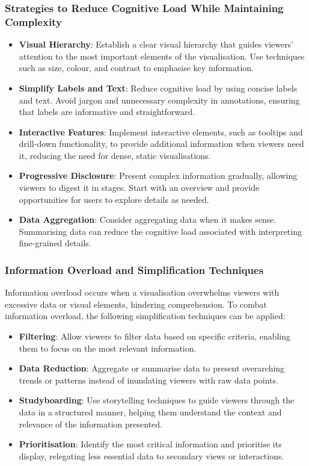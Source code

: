\documentclass{article}\usepackage[]{graphicx}\usepackage[]{xcolor}
\begin{document}
\subsubsection{Strategies to Reduce Cognitive Load While Maintaining Complexity}
\begin{itemize}
    \item \textbf{Visual Hierarchy}: Establish a clear visual hierarchy that guides viewers' attention to the most important elements of the visualisation. Use techniques such as size, colour, and contrast to emphasise key information.
    \item \textbf{Simplify Labels and Text}: Reduce cognitive load by using concise labels and text. Avoid jargon and unnecessary complexity in annotations, ensuring that labels are informative and straightforward.
    \item \textbf{Interactive Features}: Implement interactive elements, such as tooltips and drill-down functionality, to provide additional information when viewers need it, reducing the need for dense, static visualisations.
    \item \textbf{Progressive Disclosure}: Present complex information gradually, allowing viewers to digest it in stages. Start with an overview and provide opportunities for users to explore details as needed.
    \item \textbf{Data Aggregation}: Consider aggregating data when it makes sense. Summarising data can reduce the cognitive load associated with interpreting fine-grained details.
\end{itemize}

\subsubsection{Information Overload and Simplification Techniques}
Information overload occurs when a visualisation overwhelms viewers with excessive data or visual elements, hindering comprehension. To combat information overload, the following simplification techniques can be applied:
\begin{itemize}
    \item \textbf{Filtering}: Allow viewers to filter data based on specific criteria, enabling them to focus on the most relevant information.
    \item \textbf{Data Reduction}:  Aggregate or summarise data to present overarching trends or patterns instead of inundating viewers with raw data points.
    \item \textbf{Studyboarding}: Use storytelling techniques to guide viewers through the data in a structured manner, helping them understand the context and relevance of the information presented.
    \item \textbf{Prioritisation}: Identify the most critical information and prioritise its display, relegating less essential data to secondary views or interactions.
\end{itemize}
\end{document}
